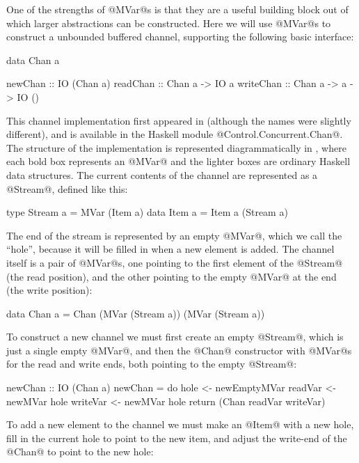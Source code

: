 
One of the strengths of @MVar@s is that they are a useful building
block out of which larger abstractions can be constructed.  Here we
will use @MVar@s to construct a unbounded buffered channel, supporting
the following basic interface:

\begin{haskell}
data Chan a

newChan   :: IO (Chan a)
readChan  :: Chan a -> IO a
writeChan :: Chan a -> a -> IO ()
\end{haskell}

\noindent This channel implementation first appeared in
\citet{jones96concurrent} (although the names were slightly
different), and is available in the Haskell module
@Control.Concurrent.Chan@.  The structure of the implementation is
represented diagrammatically in , where each bold box
represents an @MVar@ and the lighter boxes are ordinary Haskell data
structures.  The current contents of the channel are represented as a
@Stream@, defined like this:

\begin{haskell}
type Stream a = MVar (Item a)
data Item a   = Item a (Stream a)
\end{haskell}

\noindent The end of the stream is represented by an empty @MVar@,
which we call the ``hole'', because it will be filled in when a new
element is added.  The channel itself is a pair of @MVar@s, one
pointing to the first element of the @Stream@ (the read position), and
the other pointing to the empty @MVar@ at the end (the write
position):

\begin{haskell}
data Chan a
 = Chan (MVar (Stream a))
        (MVar (Stream a))
\end{haskell}

To construct a new channel we must first create an empty @Stream@, which
is just a single empty @MVar@, and then the @Chan@ constructor with
@MVar@s for the read and write ends, both pointing to the empty
@Stream@:

\begin{haskell}
newChan :: IO (Chan a)
newChan = do
   hole  <- newEmptyMVar
   readVar  <- newMVar hole
   writeVar <- newMVar hole
   return (Chan readVar writeVar)
\end{haskell}

To add a new element to the channel we must make an @Item@ with a new
hole, fill in the current hole to point to the new item, and adjust
the write-end of the @Chan@ to point to the new hole:

